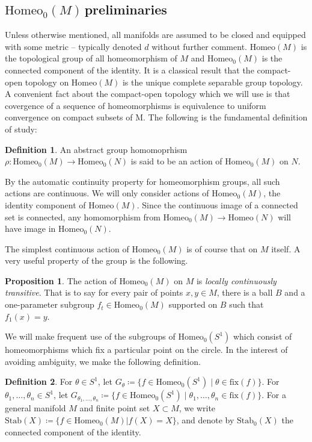 \documentclass[10pt, oneside]{article}
\newcommand{\homeo}[1][S^1]{\text{Homeo}_0(#1)}
\newcommand{\stab}[1]{\text{Stab}(#1)}
\newcommand{\pstab}[1]{\text{Stab}_0(#1)}
\newcommand{\titlesafehomeoM}{\texorpdfstring{$\homeo[M]\,$}{Homeo\_0(M)}}
\theoremstyle{definition}
\newtheorem{defn}{Definition}[section]
\newtheorem{prop}{Proposition}[section]
\theoremstyle{definition}
\begin{document}
\subsection{\titlesafehomeoM preliminaries}\label{subsec:homeoprelims}

Unless otherwise mentioned, all manifolds are assumed to be closed and equipped with some metric -- typically denoted $d$ without further comment. $\text{Homeo}(M)$ is the topological group of all homeomorphism of $M$ and $\homeo[M]$ is the connected component of the identity. It is a classical result that the compact-open topology on $\text{Homeo}(M)$ is the unique complete separable group topology\cite{kallman:UniquenessResults}. A convenient fact about the compact-open topology which we will use is that covergence of a sequence of homeomorphisms is equivalence to uniform convergence on compact subsets of M. The following is the fundamental definition of study:

\begin{defn}
    An abstract group homomoprhism $\rho: \homeo[M]\to\homeo[N]$ is said to be an action of $\homeo[M]$ on $N$. 
\end{defn}

By the automatic continuity property for homeomorphism groups\cite{mann:AutomaticContinuity}, all such actions are continuous. We will only consider actions of $\homeo[M]$, the identity component of $\text{Homeo}(M)$. Since the continuous image of a connected set is connected, any homomorphism from $\homeo[M] \to\text{Homeo}(N)$ will have image in $\homeo[N]$.

The simplest continuous action of $\homeo[M]$ is of course that on $M$ itself. A very useful property of the group is the following.

\begin{prop}\label{prop:lct}
    The action of $\homeo[M]$ on $M$ is {\it locally continuously transitive}. That is to say for every pair of points $x, y\in M$, there is a ball $B$ and a one-parameter subgroup $f_t\in \homeo[M]$ supported on $B$ such that $f_1(x) = y$.
\end{prop}

We will make frequent use of the subgroups of $\homeo$ which consist of homeomorphisms which fix a particular point on the circle. In the interest of avoiding ambiguity, we make the following definition.

\begin{defn}
     For $\theta\in S^1$, let $G_\theta\coloneqq\{f\in\homeo[S^1]\;\vert\; \theta\in\text{fix}(f)\}$.
     For $\theta_1,\dots,\theta_n\in S^1$, let $G_{\theta_1,\dots,\theta_n}\coloneqq \{f\in\homeo\;\vert\; \theta_1,\dots,\theta_n\in\text{fix}(f)\}$.
     For a general manifold $M$ and finite point set $X\subset M$, we write $\stab{X}\coloneqq\{f\in\homeo[M]\vert f(X) = X\}$, and denote by $\pstab{X}$ the connected component of the identity.
\end{defn}
\end{document}
